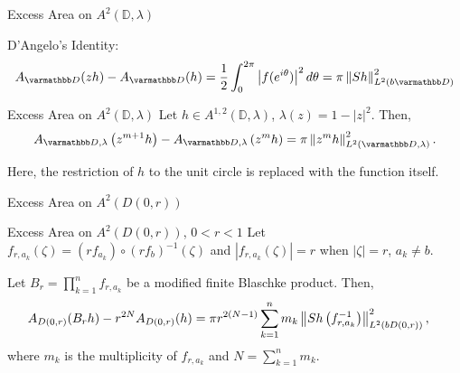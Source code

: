 \documentclass{reu_beamer}
\begin{document}
\begin{frame}{Excess Area on $A^2(\mathbb{D},\lambda)$}
    \begin{center}
        \small
        D'Angelo's Identity: 
        \[A_{\mathbb{D}}(zh) - A_{\mathbb{D}}(h) = \frac{1}{2}\int_0^{2\pi}\left|f(e^{i\theta})\right|^2d\theta = \pi \norm{Sh}_{L^{2}(b\mathbb{D})}^2\]
    \end{center}
\begin{block}{Excess Area on $A^{2}(\mathbb{D},\lambda)$}
    Let $h\in A^{1,2}(\mathbb{D},\lambda)$, $\lambda(z) = 1-|z|^2$. Then,
    \[ A_{\disc, \lambda}\left(z^{m+1}h\right)-A_{\disc, \lambda}\left(z^{m}h\right)=\pi\norm{z^mh}^2_{L^2(\mathbb{D},\lambda)}.\]
\end{block}
    Here, the restriction of $h$ to the unit circle is replaced with the function itself.
\end{frame}
\begin{frame}{Excess Area on $A^2(D(0,r))$}
    \begin{block}{Excess Area on $A^2(D(0,r))$, $0 < r < 1$}
    \small
        Let $f_{r,a_k}(\zeta)=\left(rf_{a_k}\right)\circ\left(rf_b\right)^{-1}(\zeta)$ and $\left|f_{r,a_k}(\zeta)\right|=r$ when $\left|\zeta\right|=r$, $a_k\neq b$.\newline
        
        Let $B_r = \prod_{k=1}^{n}f_{r, a_k}$ be a modified finite Blaschke product. Then,
        \begin{align*}
            A_{D(0,r)}(B_rh) - r^{2N}A_{D(0,r)}(h) &= \pi r^{2(N-1)}\sum_{k=1}^{n}m_k\left\Vert Sh\left(f_{r, a_k}^{-1}\right) \right\Vert_{L^{2}(bD(0,r))}^2,
        \end{align*}
        where $m_k$ is the multiplicity of $f_{r,a_k}$ and $N = \sum_{k=1}^{n}m_k$.
    \end{block}
\end{frame}
\end{document}
